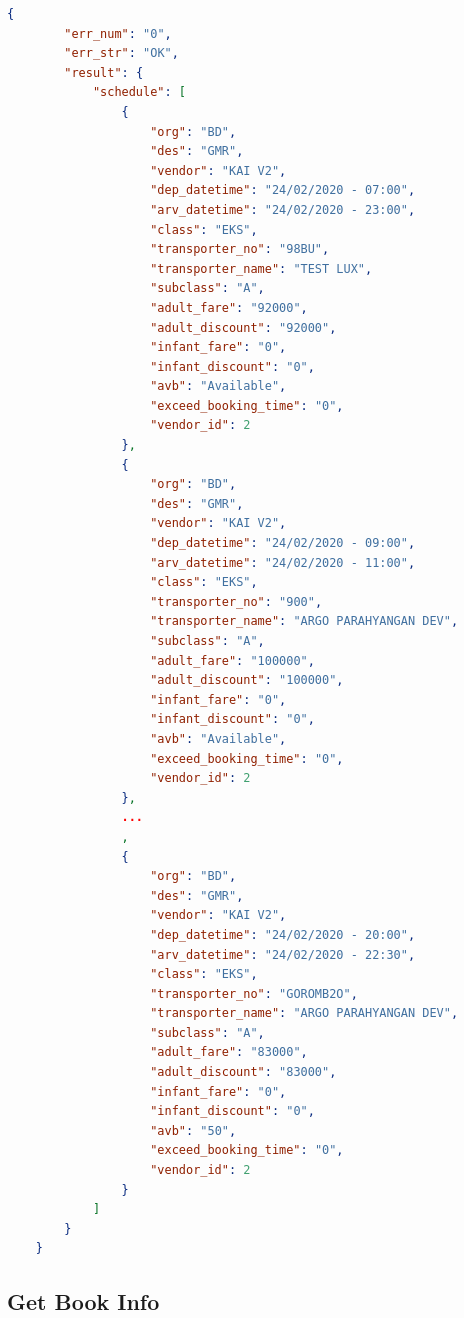 \begin{lstlisting}[language=json]
    {
        "err_num": "0",
        "err_str": "OK",
        "result": {
            "schedule": [   
                {
                    "org": "BD",
                    "des": "GMR",
                    "vendor": "KAI V2",
                    "dep_datetime": "24/02/2020 - 07:00",
                    "arv_datetime": "24/02/2020 - 23:00",
                    "class": "EKS",
                    "transporter_no": "98BU",
                    "transporter_name": "TEST LUX",
                    "subclass": "A",
                    "adult_fare": "92000",
                    "adult_discount": "92000",
                    "infant_fare": "0",
                    "infant_discount": "0",
                    "avb": "Available",
                    "exceed_booking_time": "0",
                    "vendor_id": 2
                },
                {
                    "org": "BD",
                    "des": "GMR",
                    "vendor": "KAI V2",
                    "dep_datetime": "24/02/2020 - 09:00",
                    "arv_datetime": "24/02/2020 - 11:00",
                    "class": "EKS",
                    "transporter_no": "900",
                    "transporter_name": "ARGO PARAHYANGAN DEV",
                    "subclass": "A",
                    "adult_fare": "100000",
                    "adult_discount": "100000",
                    "infant_fare": "0",
                    "infant_discount": "0",
                    "avb": "Available",
                    "exceed_booking_time": "0",
                    "vendor_id": 2
                },
                ...
                ,
                {
                    "org": "BD",
                    "des": "GMR",
                    "vendor": "KAI V2",
                    "dep_datetime": "24/02/2020 - 20:00",
                    "arv_datetime": "24/02/2020 - 22:30",
                    "class": "EKS",
                    "transporter_no": "GOROMB2O",
                    "transporter_name": "ARGO PARAHYANGAN DEV",
                    "subclass": "A",
                    "adult_fare": "83000",
                    "adult_discount": "83000",
                    "infant_fare": "0",
                    "infant_discount": "0",
                    "avb": "50",
                    "exceed_booking_time": "0",
                    "vendor_id": 2
                }
            ]
        }
    }
\end{lstlisting}

\subsection{Get Book Info}
\label{subsec:getbookinfo}

